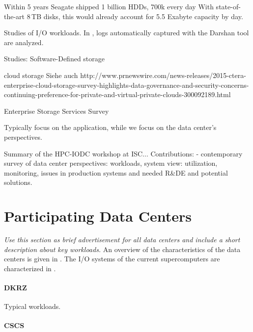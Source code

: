 \documentclass{superfri}
\numberwithin{equation}{section}
\begin{document}
Within 5 years Seagate shipped 1 billion HDDs, 700k every day 
\cite{Storage Solutions Guide - Seagate / http://www.seagate.com/files/www-content/product-content/_cross-product/en-us/docs/seagate-storage-and-application-guide-apac.pdf}
With state-of-the-art 8\,TB disks, this would already account for 5.5 Exabyte capacity by day.

Studies of I/O workloads. In \cite{luu2015multiplatform}, logs automatically captured with the Darshan tool are analyzed.

Studies: Software-Defined storage
\cite{http://datacore.com/sf-docs/default-source/whitepapers/english/the-state-of-sds-2015-survey.pdf}

cloud storage
\cite{http://www.ctera.com/enterprise-cloud-storage-survey-2015}
Siehe auch http://www.prnewswire.com/news-releases/2015-ctera-enterprise-cloud-storage-survey-highlights-data-governance-and-security-concerns-continuing-preference-for-private-and-virtual-private-clouds-300092189.html

Enterprise Storage Services Survey
\cite{http://www.idc.com/getdoc.jsp?containerId=254468}

Typically focus on the application, while we focus on the data center's perspectives.

Summary of the HPC-IODC workshop at ISC...
Contributions:
- contemporary survey of data center perspectives:
workloads, system view: utilization, monitoring, issues in production systems and needed R\&DE and potential solutions.

\section{Participating Data Centers}
\label{sec:centers}

\textit{Use this section as brief advertisement for all data centers and include a short description about key workloads.}
An overview of the characteristics of the data centers is given in .
The I/O systems of the current supercomputers are characterized in .


\paragraph{DKRZ}
Typical workloads.

\paragraph{CSCS}
\end{document}
